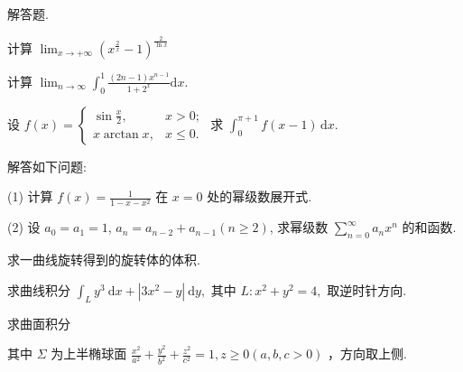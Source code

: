 \par{}
解答题.\par
计算 $\lim_{x\to +\infty}\left(x^{\frac{2}{x}} - 1\right)^{\frac{2}{\ln x}}$\par
计算 $\lim_{n\to \infty}\int_0^1\frac{(2n - 1)x^{n - 1}}{1 + 2^x}\mathrm{d}x.$\par
设 $f(x) = \begin{cases} \sin \frac{x}{2}, & x > 0; \\ x \arctan x, & x \leq 0. \end{cases}$ 求 $\int_{0}^{\pi + 1} f(x - 1) \, \mathrm{d}x$.\par
解答如下问题:\par
(1) 计算 $f(x) = \frac{1}{1 - x - x^2}$ 在 $x = 0$ 处的幂级数展开式.\par
(2) 设 $a_0 = a_1 = 1$, $a_n = a_{n-2} + a_{n-1} (n \geq 2)$, 求幂级数 $\sum_{n=0}^{\infty} a_n x^n$ 的和函数.\par
求一曲线旋转得到的旋转体的体积.\par
求曲线积分 $\int_{L} y^{3} \mathrm{~d} x + |3x^{2} - y| \mathrm{~d} y,$ 其中 $L: x^{2} + y^{2} = 4,$ 取逆时针方向.\par
\par{}
求曲面积分\par
\nopagebreak[4]
其中 $\Sigma$ 为上半椭球面 $\frac{x^2}{a^2} +\frac{y^2}{b^2} +\frac{z^2}{c^2} = 1,z\geq 0(a,b,c > 0)$ ，方向取上侧.\par
